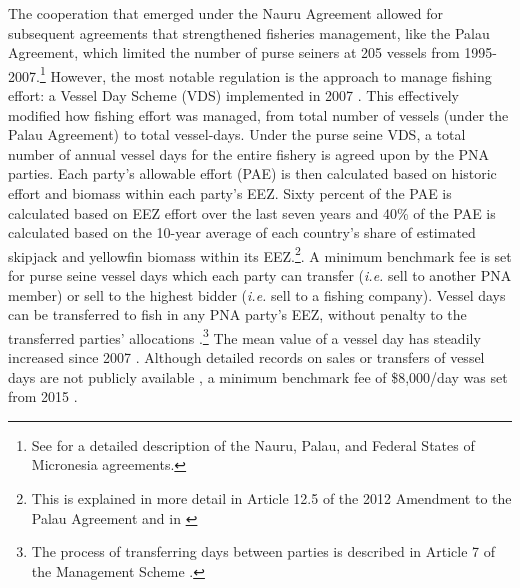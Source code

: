 \documentclass[9p,twocolumn,twoside,lineno]{pnas-new}
\begin{document}
The cooperation that emerged under the Nauru Agreement allowed for subsequent
agreements that strengthened fisheries management, like the Palau
Agreement, which limited the number of purse seiners at 205 vessels from
1995-2007.\footnote{See \cite{havice_2010} for a detailed description of the Nauru, Palau, and Federal States of Micronesia agreements.} However, the most notable regulation is
the approach to manage fishing effort: a Vessel Day Scheme (VDS)
implemented in 2007 \citep{havice_2013}. This effectively modified how
fishing effort was managed, from total number of vessels (under the Palau
Agreement) to total vessel-days. 
Under the purse seine VDS, a total number of annual vessel days for the entire fishery is agreed upon by the PNA parties. Each party’s allowable effort (PAE) is then calculated based on historic effort and biomass within each party’s EEZ. Sixty percent of the PAE is calculated based on EEZ effort over the last seven years and 40\% of the PAE is calculated based on the 10-year average of each country’s share of estimated skipjack and yellowfin biomass within its EEZ.\footnote{This is explained in more detail in Article 12.5 of the 2012 Amendment to the Palau Agreement and in \cite{Hagrannsoknir2014}}. A minimum benchmark fee is set for purse seine vessel days which each party can transfer (\emph{i.e.} sell to another PNA member) or sell to the highest bidder (\emph{i.e.} sell to a fishing company). Vessel days can be transferred to fish in any PNA party’s EEZ, without penalty to the transferred parties' allocations \cite{PNA2016}.\footnote{The process of transferring days between parties is described in Article 7 of the Management Scheme \cite{PNA2016}.} The mean value of a vessel day has steadily increased since 2007 \citep{havice_2013}. 
Although detailed records on sales or transfers of vessel days are not publicly available \citep{havice_2013,yeeting2018stabilising}, a minimum benchmark fee of \$8,000/day was set from 2015 \citep{PNA2014a}.
\end{document}
